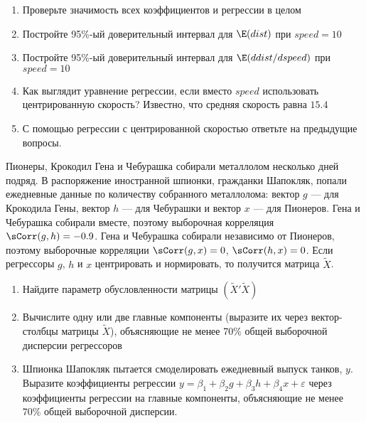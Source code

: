 \documentclass[pdftex,11pt,openany]{book}\usepackage[]{graphicx}\usepackage[]{color}
\begin{document}
\begin{problem}
\begin{enumerate}
\item Проверьте значимость всех коэффициентов и регрессии в целом
\item Постройте 95\%-ый доверительный интервал для $\E(dist)$ при $speed=10$
\item Постройте 95\%-ый доверительный интервал для $\E(ddist/dspeed)$ при $speed=10$
\item Как выглядит уравнение регрессии, если вместо $speed$ использовать центрированную скорость? Известно, что средняя скорость равна $15.4$
\item С помощью регрессии с центрированной скоростью ответьте на предыдущие вопросы.
\end{enumerate}
\end{problem}

\begin{solution}
\end{solution}


\begin{problem}
Пионеры, Крокодил Гена и Чебурашка собирали металлолом несколько дней подряд. В распоряжение иностранной шпионки, гражданки Шапокляк, попали ежедневные данные по количеству собранного металлолома: вектор $g$ --- для Крокодила Гены, вектор $h$ --- для Чебурашки и вектор $x$ --- для Пионеров. Гена и Чебурашка собирали вместе, поэтому выборочная корреляция $\sCorr(g,h)=-0.9$. Гена и Чебурашка собирали независимо от Пионеров, поэтому выборочные корреляции $\sCorr(g,x)=0$, $\sCorr(h,x)=0$. Если регрессоры $g$, $h$ и $x$ центрировать и нормировать, то получится матрица $\tilde{X}$.
\begin{enumerate}
\item Найдите параметр обусловленности матрицы $(\tilde{X}'\tilde{X})$
\item Вычислите одну или две главные компоненты (выразите их через вектор-столбцы матрицы $\tilde{X}$), объясняющие не менее 70\% общей выборочной дисперсии регрессоров
\item Шпионка Шапокляк пытается смоделировать ежедневный выпуск танков, $y$. Выразите коэффициенты регрессии $y = \beta_1 + \beta_2 g +\beta_3 h +\beta_4 x+\varepsilon$ через коэффициенты регрессии на главные компоненты, объясняющие не менее 70\% общей выборочной дисперсии. 
\end{enumerate}
\end{problem}
\begin{solution}
\end{solution}
\end{document}
